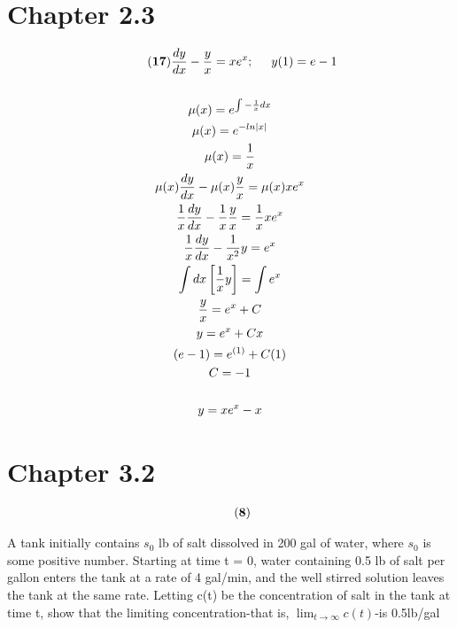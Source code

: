 \documentclass{article}
\begin{document}
\section*{Chapter 2.3}
    \begin{gather*}\tag{\textbf{17}}
        \frac{dy}{dx}-\frac{y}{x}=xe^x;\hspace{.5cm}y(1) = e-1\\\\
        \mu(x)=e^{\int-\frac{1}{x}dx}\\
        \mu(x)=e^{-ln|x|}\\
        \mu(x) = \frac{1}{x}\\
        \mu(x) \frac{dy}{dx} - \mu(x) \frac{y}{x} = \mu(x)xe^x\\
        \frac{1}{x}\frac{dy}{dx} -\frac{1}{x}\frac{y}{x}=\frac{1}{x}xe^x\\
        \frac{1}{x}\frac{dy}{dx}-\frac{1}{x^2}y=e^x\\
        \int dx\left[\frac{1}{x}y\right]= \int e^x\\
        \frac{y}{x} = e^x + C\\
        y = e^x + Cx\\
        (e-1) = e^{(1)}+C(1)\\
        C = -1\\\\
        y=xe^x - x\\
    \end{gather*}
\pagebreak\section*{Chapter 3.2}
    \begin{gather*}
        \tag{\textbf{8}}
    \end{gather*}
\begin{center}
A tank initially contains $s_0$ lb of salt dissolved in 200 gal of water, where $s_0$ is some positive number. Starting at time t = 0, water containing 0.5 lb of salt per gallon enters the tank at a rate of 4 gal/min, and the well stirred solution leaves the tank at the same rate. Letting c(t) be the concentration of salt in the tank at time t, show that the limiting concentration-that is, $\lim_{t\to\infty}c(t)$-is 0.5lb/gal
\end{center}
\end{document}
